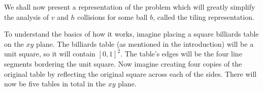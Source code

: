 We shall now present a representation of the problem which will greatly simplify the analysis of $v$ and $h$ collisions for some ball $b$, called the tiling representation.

To understand the basics of how it works, imagine placing a square billiards table on the $xy$ plane. The billiards table (as mentioned in the introduction) will be a unit square, so it will contain $[0,1]^2$. The table's edges will be the four line segments bordering the unit square. Now imagine creating four copies of the original table by reflecting the original square across each of the sides. There will now be five tables in total in the $xy$ plane.

